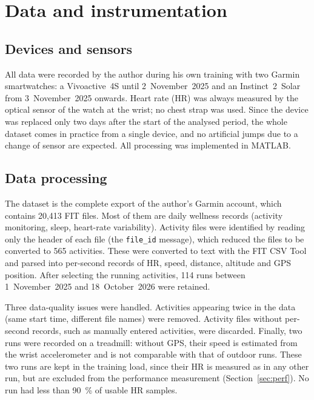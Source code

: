 \documentclass[11pt,a4paper]{article}
\begin{document}
\section{Data and instrumentation}\label{sec:data}

\subsection{Devices and sensors}
All data were recorded by the author during his own training with two Garmin
smartwatches: a Vivoactive~4S until 2~November~2025 and an Instinct~2~Solar from
3~November~2025 onwards. Heart rate (HR) was always measured by the optical
sensor of the watch at the wrist; no chest strap was used. Since the device was
replaced only two days after the start of the analysed period, the whole
dataset comes in practice from a single device, and no artificial jumps due to a
change of sensor are expected. All processing was implemented in MATLAB.

\subsection{Data processing}
The dataset is the complete export of the author's Garmin account, which
contains 20{,}413 FIT files. Most of them are daily wellness records
(activity monitoring, sleep, heart-rate variability). Activity files were
identified by reading only the header of each file (the \texttt{file\_id}
message), which reduced the files to be converted to 565 activities. These were
converted to text with the FIT CSV Tool \citep{garminfit} and parsed into
per-second records of HR, speed, distance, altitude and GPS position. After
selecting the running activities, 114 runs between 1~November~2025 and
18~October~2026 were retained.

Three data-quality issues were handled. Activities appearing twice in the
data (same start time, different file names) were removed. Activity files
without per-second records, such as manually entered activities, were
discarded. Finally, two runs were recorded on a treadmill: without GPS, their
speed is estimated from the wrist accelerometer and is not comparable with that
of outdoor runs. These two runs are kept in the training load, since their HR
is measured as in any other run, but are excluded from the performance
measurement (Section~\ref{sec:perf}). No run had less than \SI{90}{\percent} of
usable HR samples.
\end{document}
